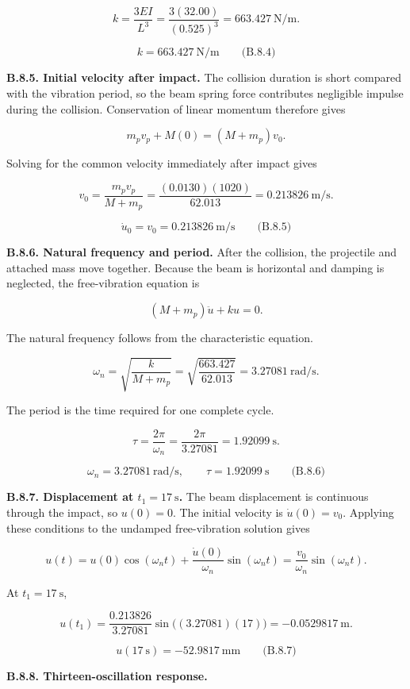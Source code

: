 \[
k=\frac{3EI}{L^3}
 =\frac{3(32.00)}{(0.525)^3}
 =663.427\ \mathrm{N/m}.
\]

\[
\boxed{k=663.427\ \mathrm{N/m}}
\qquad\text{(B.8.4)}
\]

\textbf{B.8.5. Initial velocity after impact.} The collision duration is short compared with the vibration period, so the beam spring force contributes negligible impulse during the collision. Conservation of linear momentum therefore gives

\[
m_pv_p+M(0)=(M+m_p)v_0.
\]

Solving for the common velocity immediately after impact gives

\[
v_0=\frac{m_pv_p}{M+m_p}
 =\frac{(0.0130)(1020)}{62.013}
 =0.213826\ \mathrm{m/s}.
\]

\[
\boxed{\dot{u}_0=v_0=0.213826\ \mathrm{m/s}}
\qquad\text{(B.8.5)}
\]

\textbf{B.8.6. Natural frequency and period.} After the collision, the projectile and attached mass move together. Because the beam is horizontal and damping is neglected, the free-vibration equation is

\[
(M+m_p)\ddot{u}+ku=0.
\]

The natural frequency follows from the characteristic equation.

\[
\omega_n=\sqrt{\frac{k}{M+m_p}}
 =\sqrt{\frac{663.427}{62.013}}
 =3.27081\ \mathrm{rad/s}.
\]

The period is the time required for one complete cycle.

\[
\tau=\frac{2\pi}{\omega_n}
 =\frac{2\pi}{3.27081}
 =1.92099\ \mathrm{s}.
\]

\[
\boxed{\omega_n=3.27081\ \mathrm{rad/s},
\qquad
\tau=1.92099\ \mathrm{s}}
\qquad\text{(B.8.6)}
\]

\textbf{B.8.7. Displacement at $t_1=17\ \mathrm{s}$.} The beam displacement is continuous through the impact, so $u(0)=0$. The initial velocity is $\dot{u}(0)=v_0$. Applying these conditions to the undamped free-vibration solution gives

\[
u(t)=u(0)\cos(\omega_nt)
 +\frac{\dot{u}(0)}{\omega_n}\sin(\omega_nt)
 =\frac{v_0}{\omega_n}\sin(\omega_nt).
\]

At $t_1=17\ \mathrm{s}$,

\[
u(t_1)=\frac{0.213826}{3.27081}\sin\bigl((3.27081)(17)\bigr)
 =-0.0529817\ \mathrm{m}.
\]

\[
\boxed{u(17\ \mathrm{s})=-52.9817\ \mathrm{mm}}
\qquad\text{(B.8.7)}
\]

\textbf{B.8.8. Thirteen-oscillation response.}


